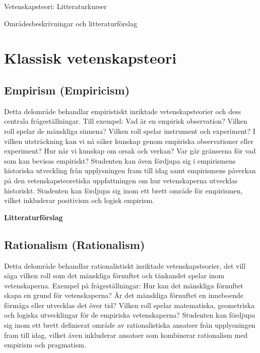 \documentclass[12pt,a4paper]{article}
\begin{document}
\begin{Huge}
Vetenskapsteori: Litteraturkurser
\end{Huge}

\medskip 
{\Large Områdesbeskrivningar och litteraturförslag}


\makeatletter
{}
\makeatother


\section{Klassisk vetenskapsteori}

\subsection{Empirism (Empiricism)}

 Detta delområde behandlar empiristiskt inriktade vetenskapsteorier och dess centrala frågeställningar. Till exempel: Vad är en empirisk observation? Vilken roll spelar de mänskliga sinnena? Vilken roll spelar instrument och experiment? I vilken utsträckning kan vi nå säker kunskap genom empiriska observationer eller experiment? Hur når vi kunskap om orsak och verkan? Var går gränserna för vad som kan bevisas empiriskt? Studenten kan även fördjupa sig i empirismens historiska utveckling från upplysningen fram till idag samt empirismens påverkan på den vetenskapsteoretiska uppfattningen om hur vetenskaperna utvecklas historiskt. Studenten kan fördjupa sig inom ett brett område för empirismen, vilket inkluderar positivism och logisk empirism. 
 
\noindent \textbf{Litteraturförslag}

 
 
 
 

 
\subsection{Rationalism (Rationalism)} 

Detta delområde behandlar rationalistiskt inriktade vetenskapsteorier, det vill säga vilken roll som det mänskliga förnuftet och tänkandet spelar inom vetenskaperna. Exempel på frågeställningar: Hur kan det mänskliga förnuftet skapa en grund för vetenskaperna? Är det mänskliga förnuftet en inneboende förmåga eller utvecklas det över tid? Vilken roll spelar matematiska, geometriska och logiska utvecklingar för de empiriska vetenskaperna? Studenten kan fördjupa sig inom ett brett definierat område av rationalistiska ansatser från upplysningen fram till idag, vilket även inkluderar ansatser som kombinerar rationalism med empirism och pragmatism. 
\end{document}
